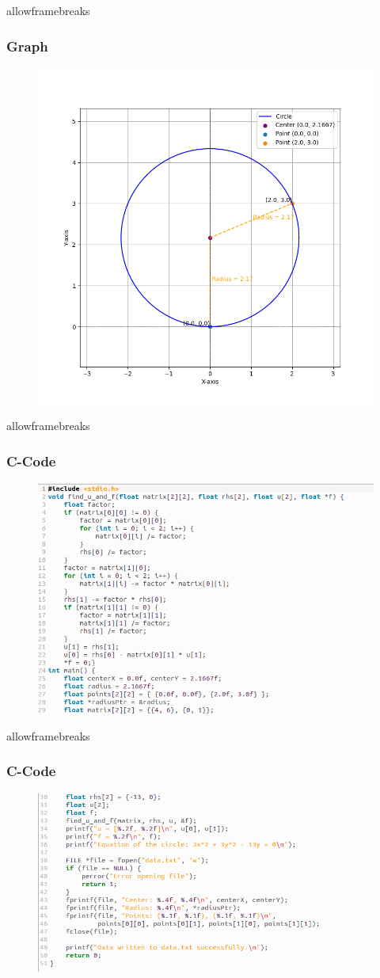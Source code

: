 \documentclass{beamer}
\begin{document}
\begin{frame}{allowframebreaks}
\frametitle{Graph}
\begin{figure}[ht]
\centering
\includegraphics[width=0.7\linewidth]{figs/Fig1.png}
\end{figure}
\end{frame}


\begin{frame}{allowframebreaks}
\frametitle{C-Code}
\begin{figure}[ht]
\centering
\includegraphics[width=0.7\linewidth]{figs/Fig2.png}
\end{figure}
\end{frame}


\begin{frame}{allowframebreaks}
\frametitle{C-Code}
\begin{figure}[ht]
\centering
\includegraphics[width=0.7\linewidth]{figs/Fig3.png}        \end{figure}
\end{frame}
\end{document}
